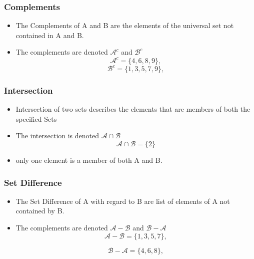 \documentclass[11pt,a4paper,titlepage,oneside,openany]{article}
\numberwithin{equation}{section}
\numberwithin{algorithm}{section}
\numberwithin{figure}{section}
\numberwithin{table}{section}
\begin{document}
\subsubsection*{Complements}
\begin{itemize}

\item The Complements of A and B are the elements of the universal set not contained in A and B.

\item The complements are denoted $\mathcal{A}^{c}$ and $\mathcal{B}^{c}$
\[ \mathcal{A}^{c} = \{4,6,8,9\}, \]
\[ \mathcal{B}^{c} = \{1,3,5,7,9\}, \]

\end{itemize}



\subsubsection*{Intersection}
\begin{itemize}

\item Intersection of two sets describes the elements that are members of both the specified Sets

\item The intersection is denoted $\mathcal{A\cap B}$
\[ \mathcal{A\cap B} = \{2\}\]

\item only one element is a member of both A and B.
\end{itemize}

\subsubsection*{Set Difference}
\begin{itemize}

\item The Set Difference of A with regard to B are list of elements of A not contained by B.

\item The complements are denoted $\mathcal{A-B}$ and $\mathcal{B-A}$
\[ \mathcal{A-B} = \{1,3,5,7\}, \]

\[ \mathcal{B-A} = \{4,6,8\}, \]
\end{itemize}
\end{document}
